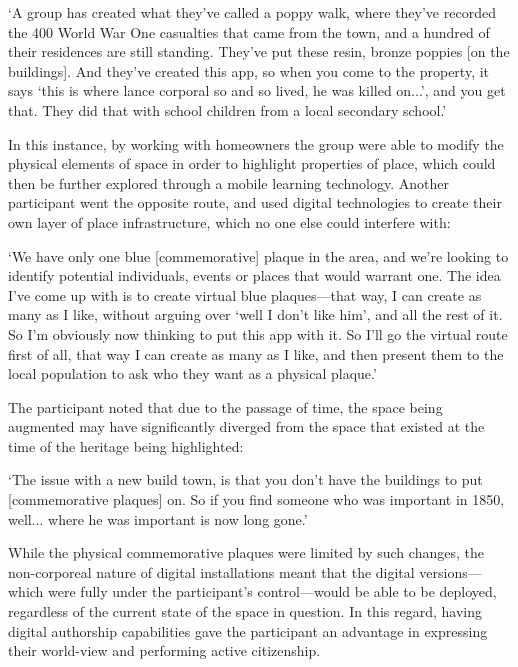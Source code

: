 \begin{displayquote}
`A group has created what they've called a poppy walk, where they've recorded the 400 World War One casualties that came from the town, and a hundred of their residences are still standing. They've put these resin, bronze poppies [on the buildings]. And they've created this app, so when you come to the property, it says `this is where lance corporal so and so lived, he was killed on...', and you get that. They did that with school children from a local secondary school.'
\end{displayquote}

In this instance, by working with homeowners the group were able to modify the physical elements of space in order to highlight properties of place, which could then be further explored through a mobile learning technology. Another participant went the opposite route, and used digital technologies to create their own layer of place infrastructure, which no one else could interfere with:

\begin{displayquote}
`We have only one blue [commemorative] plaque in the area, and we're looking to identify potential individuals, events or places that would warrant one. The idea I've come up with is to create virtual blue plaques---that way, I can create as many as I like, without arguing over `well I don't like him', and all the rest of it. So I'm obviously now thinking to put this app with it. So I'll go the virtual route first of all, that way I can create as many as I like, and then present them to the local population to ask who they want as a physical plaque.'
\end{displayquote}

The participant noted that due to the passage of time, the space being augmented may have significantly diverged from the space that existed at the time of the heritage being highlighted:

\begin{displayquote}
`The issue with a new build town, is that you don't have the buildings to put [commemorative plaques] on. So if you find someone who was important in 1850, well... where he was important is now long gone.'
\end{displayquote}

While the physical commemorative plaques were limited by such changes, the non-corporeal nature of digital installations meant that the digital versions---which were fully under the participant's control---would be able to be deployed, regardless of the current state of the space in question. In this regard, having digital authorship capabilities gave the participant an advantage in expressing their world-view and performing active citizenship.

